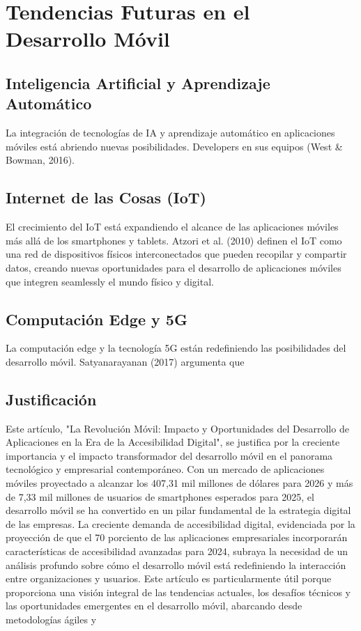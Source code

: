 \documentclass[12pt]{article}
\begin{document}
\section*{Tendencias Futuras en el Desarrollo Móvil}

\subsection*{Inteligencia Artificial y Aprendizaje Automático}
La integración de tecnologías de IA y aprendizaje automático en aplicaciones móviles está abriendo nuevas posibilidades. Developers en sus equipos (West \& Bowman, 2016).

\subsection*{Internet de las Cosas (IoT)}
El crecimiento del IoT está expandiendo el alcance de las aplicaciones móviles más allá de los smartphones y tablets. Atzori et al. (2010) definen el IoT como una red de dispositivos físicos interconectados que pueden recopilar y compartir datos, creando nuevas oportunidades para el desarrollo de aplicaciones móviles que integren seamlessly el mundo físico y digital.

\subsection*{Computación Edge y 5G}
La computación edge y la tecnología 5G están redefiniendo las posibilidades del desarrollo móvil. Satyanarayanan (2017) argumenta que

\subsection*{Justificación}
Este artículo, "La Revolución Móvil: Impacto y Oportunidades del Desarrollo de Aplicaciones en la Era de la Accesibilidad Digital", se justifica por la creciente importancia y el impacto transformador del desarrollo móvil en el panorama tecnológico y empresarial contemporáneo. Con un mercado de aplicaciones móviles proyectado a alcanzar los 407,31 mil millones de dólares para 2026 y más de 7,33 mil millones de usuarios de smartphones esperados para 2025, el desarrollo móvil se ha convertido en un pilar fundamental de la estrategia digital de las empresas. La creciente demanda de accesibilidad digital, evidenciada por la proyección de que el 70 porciento de las aplicaciones empresariales incorporarán características de accesibilidad avanzadas para 2024, subraya la necesidad de un análisis profundo sobre cómo el desarrollo móvil está redefiniendo la interacción entre organizaciones y usuarios. Este artículo es particularmente útil porque proporciona una visión integral de las tendencias actuales, los desafíos técnicos y las oportunidades emergentes en el desarrollo móvil, abarcando desde metodologías ágiles y
 
\end{document}
